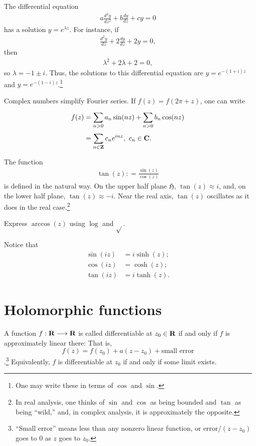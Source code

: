 \documentclass[11pt, oneside,margin=1in]{article}
\begin{document}
The differential equation
\begin{align*}
	a \frac{d^2y}{dz^2}+ b \frac{dy}{dz}+cy =0
\end{align*}
has a solution $y=e^{\lambda z} $. For instance, if
\begin{align*}
	\frac{d^2y}{dz}+2\frac{dy}{dz}+2y =0,
\end{align*}
then
\begin{align*}
	\lambda ^2 + 2\lambda + 2 =0,
\end{align*}
so $\lambda = -1\pm i$. Thus, the solutions to this differential equation are $y=e^{-(1+i)z}$ and $y = e^{-(1-i)z}$.\footnote{One may write these in terms of $\cos$ and $\sin$.}

Complex numbers simplify Fourier series. If $f(z) =f(2\pi+z)$, one can write
\begin{align*}
	f(z) &=  \sum_{n>0}^{} a_n\sin (nz) + \sum_{n>0}^{} b_n\cos (nz)\\
	     &= \sum_{n\in\mathbf Z}^{} c_ne^{inz},\ c_n\in \mathbf C.
\end{align*}

The function
\begin{align*}
	\tan (z): = \frac{\sin (z)}{\cos (z)}
\end{align*}
is defined in the natural way. On the upper half plane $\mathfrak H$, $\tan (z) \approx i$, and, on the lower half plane, $\tan (z) \approx -i$. Near the real axis, $\tan (z)$ oscillates as it does in the real case.\footnote{In real analysis, one thinks of $\sin$ and $\cos$ as being bounded and $\tan$ as being ``wild,'' and, in complex analysis, it is approximately the opposite.}

 \begin{exercise}\label{}\text{}
Express $\arccos (z)$ using $\log$ and $\sqrt{} $.
\end{exercise}

Notice that 
\begin{align*}
	\sin (iz) &= i\sinh (z);\\
	\cos (iz) &= \cosh (z);\\
	\tan (iz) &= i\tanh (z).
\end{align*}

\section{Holomorphic functions}
A function $f:\mathbf R\longrightarrow \mathbf R$ is called differentiable at $z_0\in \mathbf R$ if and only if $f$ is approximately linear there: That is, 
\[
	f(z)= f (z_0)+a (z-z_0) + \textrm{small error}
\]
.\footnote{``Small error'' means less than any nonzero linear function, or $\mathrm{error}/(z-z_0)$ goes to $0$ as $z$ goes to $z_0$.} Equivalently, $f$ is differentiable at $z_0$ if and only if some limit exists. 
\end{document}
